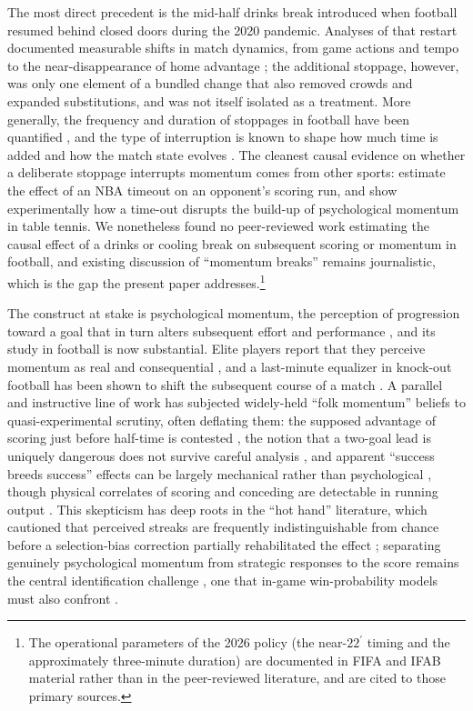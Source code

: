 \documentclass[11pt]{article}
\begin{document}
The most direct precedent is the mid-half drinks break introduced when football resumed behind closed doors
during the 2020 pandemic. Analyses of that restart documented measurable shifts in match dynamics, from game
actions and tempo \citep{garciaaliaga2022covid} to the near-disappearance of home advantage
\citep{almeida2021covid,fischer2021ghost,link2022covid}; the additional stoppage, however, was only one
element of a bundled change that also removed crowds and expanded substitutions, and was not itself isolated
as a treatment. More generally, the frequency and duration of stoppages in football have been quantified
\citep{siegle2012stoppages}, and the type of interruption is known to shape how much time is added and how the
match state evolves \citep{li2024additional}. The cleanest causal evidence on whether a deliberate stoppage
interrupts momentum comes from other sports: \citet{gibbs2022timeout} estimate the effect of an NBA timeout on
an opponent's scoring run, and \citet{denhartigh2018tabletennis} show experimentally how a time-out disrupts
the build-up of psychological momentum in table tennis. We nonetheless found no peer-reviewed work estimating
the causal effect of a drinks or cooling break on subsequent scoring or momentum in football, and existing
discussion of ``momentum breaks'' remains journalistic, which is the gap the present paper
addresses.\footnote{The operational parameters of the 2026 policy (the near-$22^{\prime}$ timing and the
approximately three-minute duration) are documented in FIFA and IFAB material rather than in the peer-reviewed
literature, and are cited to those primary sources.}

The construct at stake is psychological momentum, the perception of progression toward a goal that in turn
alters subsequent effort and performance \citep{vallerand1988momentum,gernigon2010momentum}, and its study in
football is now substantial. Elite players report that they perceive momentum as real and consequential
\citep{redwoodbrown2018perceptions}, and a last-minute equalizer in knock-out football has been shown to shift
the subsequent course of a match \citep{denhartigh2020equalizer}. A parallel and instructive line of work has
subjected widely-held ``folk momentum'' beliefs to quasi-experimental scrutiny, often deflating them: the
supposed advantage of scoring just before half-time is contested \citep{gauriot2018halftime,meier2020myth,baert2018halftime},
the notion that a two-goal lead is uniquely dangerous does not survive careful analysis \citep{kent2025twogoal},
and apparent ``success breeds success'' effects can be largely mechanical rather than psychological
\citep{gauriot2019success}, though physical correlates of scoring and conceding are detectable in running output
\citep{konefal2024running}. This skepticism has deep roots in the ``hot hand'' literature, which cautioned that
perceived streaks are frequently indistinguishable from chance \citep{gilovich1985hothand,bareli2006hothand}
before a selection-bias correction partially rehabilitated the effect \citep{miller2018hothand}; separating
genuinely psychological momentum from strategic responses to the score remains the central identification
challenge \citep{meier2020tennis}, one that in-game win-probability models must also confront
\citep{robberechts2021winprob}.
\end{document}
